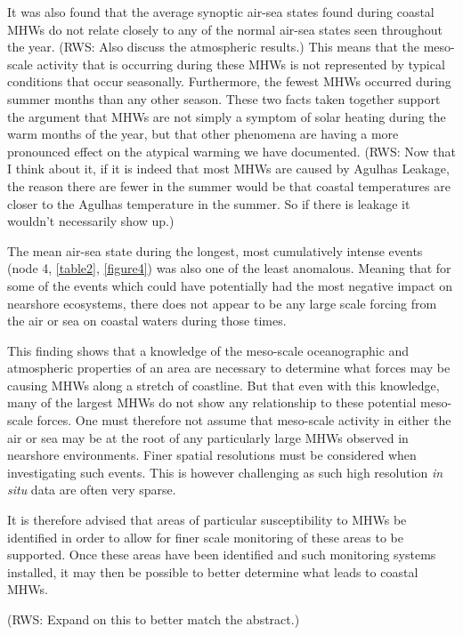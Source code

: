 \documentclass[a4paper,10pt,review]{elsarticle}
\begin{document}
It was also found that the average synoptic air-sea states found during coastal MHWs do not relate closely to any of the normal air-sea states seen throughout the year. (RWS: Also discuss the atmospheric results.) This means that the meso-scale activity that is occurring during these MHWs is not represented by typical conditions that occur seasonally. Furthermore, the fewest MHWs occurred during summer months than any other season. These two facts taken together support the argument that MHWs are not simply a symptom of solar heating during the warm months of the year, but that other phenomena are having a more pronounced effect on the atypical warming we have documented. (RWS: Now that I think about it, if it is indeed that most MHWs are caused by Agulhas Leakage, the reason there are fewer in the summer would be that coastal temperatures are closer to the Agulhas temperature in the summer. So if there is leakage it wouldn't necessarily show up.)

The mean air-sea state during the longest, most cumulatively intense events (node 4, \cref{table2}, \cref{figure4}) was also one of the least anomalous. Meaning that for some of the events which could have potentially had the most negative impact on nearshore ecosystems, there does not appear to be any large scale forcing from the air or sea on coastal waters during those times.

This finding shows that a knowledge of the meso-scale oceanographic and atmospheric properties of an area are necessary to determine what forces may be causing MHWs along a stretch of coastline. But that even with this knowledge, many of the largest MHWs do not show any relationship to these potential meso-scale forces. One must therefore not assume that meso-scale activity in either the air or sea may be at the root of any particularly large MHWs observed in nearshore environments. Finer spatial resolutions must be considered when investigating such events. This is however challenging as such high resolution \emph{in situ} data are often very sparse.

It is therefore advised that areas of particular susceptibility to MHWs be identified in order to allow for finer scale monitoring of these areas to be supported. Once these areas have been identified and such monitoring systems installed, it may then be possible to better determine what leads to coastal MHWs. 

(RWS: Expand on this to better match the abstract.)
\end{document}
